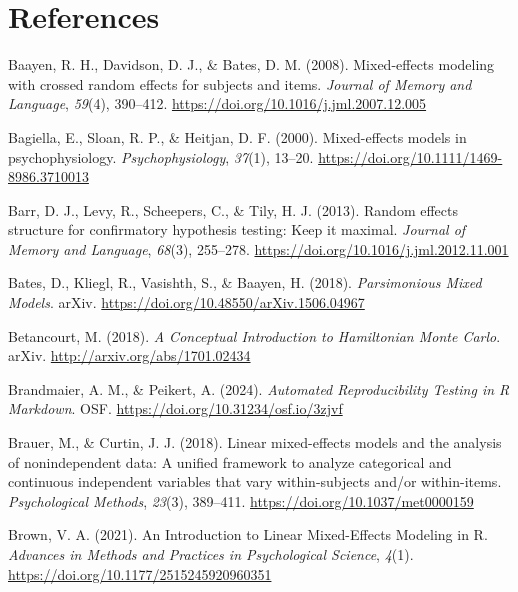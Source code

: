 \documentclass[
  doc,12pt,floatsintext]{apa7}
\newlength{\cslhangindent}
\newenvironment{CSLReferences}[2] %
 {\begin{list}{}{%
  \setlength{\itemindent}{0pt}
  \setlength{\leftmargin}{0pt}
  \setlength{\parsep}{0pt}
  \ifodd #1
   \setlength{\leftmargin}{\cslhangindent}
   \setlength{\itemindent}{-1\cslhangindent}
  \fi
  \setlength{\itemsep}{#2\baselineskip}}}
 {\end{list}}
\begin{document}
\newpage

\section{References}\label{references}

\label{refs}
\begin{CSLReferences}{1}{0}
Baayen, R. H., Davidson, D. J., \& Bates, D. M. (2008). Mixed-effects modeling with crossed random effects for subjects and items. \emph{Journal of Memory and Language}, \emph{59}(4), 390--412. \url{https://doi.org/10.1016/j.jml.2007.12.005}

Bagiella, E., Sloan, R. P., \& Heitjan, D. F. (2000). Mixed-effects models in psychophysiology. \emph{Psychophysiology}, \emph{37}(1), 13--20. \url{https://doi.org/10.1111/1469-8986.3710013}

Barr, D. J., Levy, R., Scheepers, C., \& Tily, H. J. (2013). Random effects structure for confirmatory hypothesis testing: {Keep} it maximal. \emph{Journal of Memory and Language}, \emph{68}(3), 255--278. \url{https://doi.org/10.1016/j.jml.2012.11.001}

Bates, D., Kliegl, R., Vasishth, S., \& Baayen, H. (2018). \emph{Parsimonious {Mixed Models}}. arXiv. \url{https://doi.org/10.48550/arXiv.1506.04967}

Betancourt, M. (2018). \emph{A {Conceptual Introduction} to {Hamiltonian Monte Carlo}}. arXiv. \url{http://arxiv.org/abs/1701.02434}

Brandmaier, A. M., \& Peikert, A. (2024). \emph{Automated {Reproducibility Testing} in {R Markdown}}. OSF. \url{https://doi.org/10.31234/osf.io/3zjvf}

Brauer, M., \& Curtin, J. J. (2018). Linear mixed-effects models and the analysis of nonindependent data: {A} unified framework to analyze categorical and continuous independent variables that vary within-subjects and/or within-items. \emph{Psychological Methods}, \emph{23}(3), 389--411. \url{https://doi.org/10.1037/met0000159}

Brown, V. A. (2021). An {Introduction} to {Linear Mixed-Effects Modeling} in {R}. \emph{Advances in Methods and Practices in Psychological Science}, \emph{4}(1). \url{https://doi.org/10.1177/2515245920960351}


\end{CSLReferences}
\end{document}
